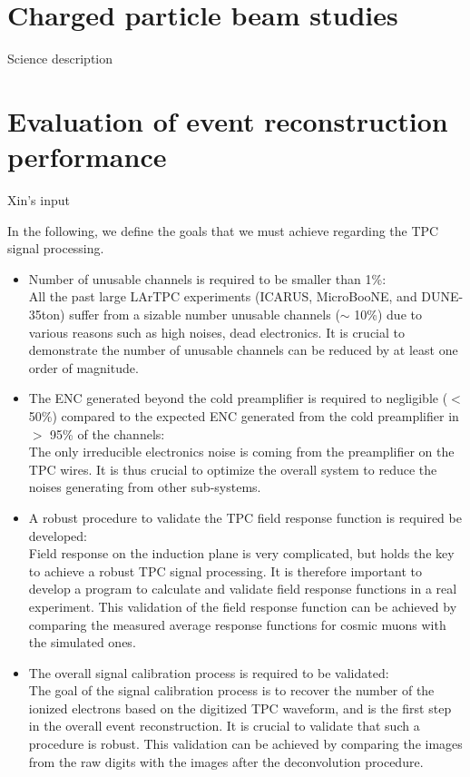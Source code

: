 
\section{Charged particle beam studies}
Science description


\section{Evaluation of event reconstruction performance}

Xin's input

In the following, we define the goals that we must achieve regarding the TPC signal processing.
\begin{itemize}
\item Number of unusable channels is required to be smaller than 1\%: \\
All the past large LArTPC experiments (ICARUS, MicroBooNE, and DUNE-35ton) suffer from a sizable
number unusable channels ($\sim$ 10\%) due to various reasons such as high noises, dead electronics.
It is crucial to demonstrate the number of unusable channels can be reduced by at least one order
of magnitude. 
\item The ENC generated beyond the cold preamplifier is required to negligible ($<$ 50\%) compared to the 
expected ENC generated from the cold preamplifier in $>$ 95\% of the channels: \\
The only irreducible electronics noise is coming from the preamplifier on the TPC wires. It is thus
crucial to optimize the overall system to reduce the noises generating from other sub-systems. 
\item A robust procedure to validate the TPC field response function is required
be developed: \\
Field response on the induction plane is very complicated, but holds the key to achieve a robust TPC 
signal processing. It is therefore important to develop a program to calculate and validate field 
response functions in a real experiment. This validation of the field response function can be
achieved by comparing the measured average response functions for cosmic muons with the simulated
ones. 
\item The overall signal calibration process is required to be validated: \\
The goal of the signal calibration process is to recover the number of the ionized electrons based on
the digitized TPC waveform, and is the first step in the overall event reconstruction. It is crucial to 
validate that such a procedure is robust. This validation can be achieved by comparing the 
images from the raw digits with the images after the deconvolution procedure.
\end{itemize}

